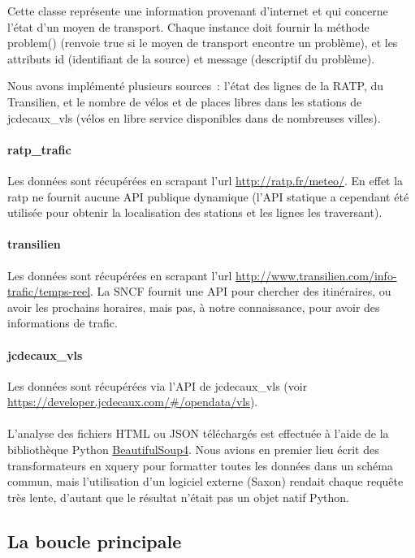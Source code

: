 \documentclass[a4paper, 8pt]{article}
\begin{document}
Cette classe représente une information provenant d'internet et qui concerne
l'état d'un moyen de transport.
Chaque instance doit fournir la méthode problem() (renvoie true si le moyen de
transport encontre un problème), et les attributs id (identifiant de la source)
et message (descriptif du problème).

Nous avons implémenté plusieurs sources~: l'état des lignes de la RATP, du
Transilien, et le nombre de vélos et de places libres dans les stations de
jcdecaux\_vls (vélos en libre service disponibles dans de nombreuses villes).

\paragraph{ratp\_trafic} Les données sont récupérées en scrapant l'url
\url{http://ratp.fr/meteo/}.
En effet la ratp ne fournit aucune API publique dynamique (l'API statique a
cependant été utilisée pour obtenir la localisation des stations et les lignes
les traversant).

\paragraph{transilien} Les données sont récupérées en scrapant l'url \url{http://www.transilien.com/info-trafic/temps-reel}.
La SNCF fournit une API pour chercher des itinéraires, ou avoir les prochains
horaires, mais pas, à notre connaissance, pour avoir des informations de trafic.

\paragraph{jcdecaux\_vls} Les données sont récupérées via l'API de jcdecaux\_vls
(voir \url{https://developer.jcdecaux.com/#/opendata/vls}).

\paragraph{} L'analyse des fichiers HTML ou JSON téléchargés est effectuée à
l'aide de la bibliothèque Python
\href{http://www.crummy.com/software/BeautifulSoup/bs4/doc/}{BeautifulSoup4}.
Nous avions en premier lieu écrit des transformateurs en xquery pour formatter
toutes les données dans un schéma commun, mais l'utilisation d'un logiciel
externe (Saxon) rendait chaque requête très lente, d'autant que le résultat
n'était pas un objet natif Python.

\subsection{La boucle principale}
\end{document}
